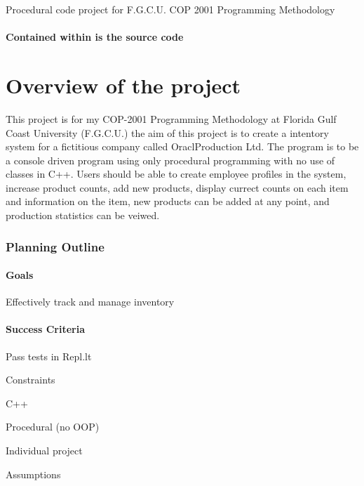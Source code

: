 Procedural code project for F.\+G.\+C.\+U. C\+OP 2001 Programming Methodology

\paragraph*{Contained within is the source code}

\section*{Overview of the project}

This project is for my C\+O\+P-\/2001 Programming Methodology at Florida Gulf Coast University (F.\+G.\+C.\+U.) the aim of this project is to create a intentory system for a fictitious company called Oracl\+Production Ltd. The program is to be a console driven program using only procedural programming with no use of classes in C++. Users should be able to create employee profiles in the system, increase product counts, add new products, display currect counts on each item and information on the item, new products can be added at any point, and production statistics can be veiwed.

\subsubsection*{Planning Outline}

\paragraph*{Goals}


\begin{DoxyItemize}
\item Effectively track and manage inventory
\end{DoxyItemize}

\paragraph*{Success Criteria}


\begin{DoxyItemize}
\item Pass tests in Repl.\+lt
\item Constraints
\item C++
\item Procedural (no O\+OP)
\item Individual project
\item Assumptions
\end{DoxyItemize}

